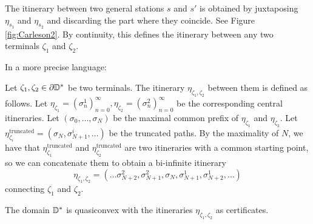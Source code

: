 
The itinerary between two general stations $s$ and $s'$ is obtained by juxtaposing $\eta_{s_1}$ and $\eta_{s_2}$ and discarding the part where they coincide. See Figure \ref{fig:Carleson2}. 
By continuity, this defines the itinerary between any two terminals $\zeta_1$ and $\zeta_2$.

In a more precise language:
\begin{definition}
	Let $\zeta_{1},\zeta_{2}\in\partial\mathbb{D}^*$ be two terminals. The itinerary $\eta_{\zeta_{1},\zeta_{2}}$ between them is defined as follows.
	Let $\eta_{\zeta_{1}}=\left(\sigma_{n}^{1}\right)_{n=0}^{\infty},\eta_{\zeta_{2}}=\left(\sigma_{n}^{2}\right)_{n=0}^{\infty}$
	be the corresponding central itineraries.	
	Let $\left(\sigma_{0},\ldots,\sigma_{N}\right)$ be the maximal common
	prefix of $\eta_{\zeta_{1}}$ and $\eta_{\zeta_{2}}$. Let $\eta_{\zeta_{i}}^{\text{truncated}}=\left(\sigma_{N},\sigma_{N+1}^{i},\ldots\right)$
	be the truncated paths. By the maximality of $N$, we have that $\eta_{\zeta_{1}}^{\text{truncated}}$
	and $\eta_{\zeta_{2}}^{\text{truncated}}$ are two itineraries with a common
	starting point, so we can concatenate them to obtain a bi-infinite itinerary 
	\[
	\eta_{\zeta_{1},\zeta_{2}}=\left(\ldots\sigma_{N+2}^{2},\sigma_{N+1}^{2},\sigma_{N},\sigma_{N+1}^{1},\sigma_{N+2}^{1},\ldots\right)
	\]
	connecting $\zeta_{1}$ and $\zeta_{2}$.
	
	
\end{definition}

\begin{theorem} \label{quasiconvex disk}
The domain $\mathbb{D}^{*}$ is quasiconvex with the itineraries $\eta_{\zeta_1,\zeta_2}$ as certificates.
\end{theorem}

